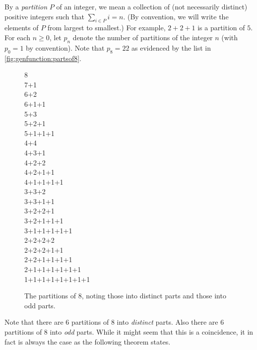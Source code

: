 By a \emph{partition} $P$ of an integer, we mean a collection of (not
necessarily distinct) positive integers such that $\sum_{i\in P} i =
n$. (By convention, we will write the elements of $P$ from largest to
smallest.) For example, $2+2+1$ is a partition of $5$. For each
$n\ge0$, let $p_n$ denote the number of partitions of the integer $n$
(with $p_0=1$ by convention).  Note that $p_8=22$ as evidenced by the
list in \autoref{fig:genfunction:partsof8}.
\begin{figure}[hb]
\begin{multicols}{3}
  8\quad{}\\
  7+1\quad{}\\
  6+2\quad{}\\
  6+1+1\\
  5+3\quad{}\\
  5+2+1\quad{}\\
  5+1+1+1\quad{}\\
  4+4\\
  4+3+1\quad{}\\
  4+2+2\\
  4+2+1+1\\
  4+1+1+1+1\\
  3+3+2\\
  3+3+1+1\quad{}\\
  3+2+2+1\\
  3+2+1+1+1\\
  3+1+1+1+1+1\quad{}\\
  2+2+2+2\\
  2+2+2+1+1\\
  2+2+1+1+1+1\\
  2+1+1+1+1+1+1\\
  1+1+1+1+1+1+1+1\quad{}  
\end{multicols}
\caption{The partitions of $8$, noting those into distinct parts
  and those into odd parts.}
\label{fig:genfunction:partsof8}
\end{figure}
Note that there are $6$ partitions of $8$ into \textit{distinct} parts. Also
there are $6$ partitions of $8$ into \textit{odd} parts. While it
might seem that this is a coincidence, it in fact is always the case
as the following theorem states.

